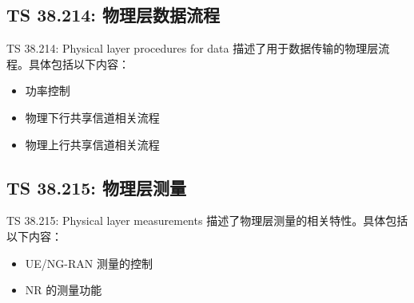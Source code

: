 \documentclass[cn,hazy,blue,14pt,screen,device=normal]{elegantnote}
\begin{document}
\subsection{TS 38.214: 物理层数据流程}
TS 38.214: Physical layer procedures for data 描述了用于数据传输的物理层流程。具体包括以下内容：
\begin{itemize}[leftmargin=2cm]
	\item 功率控制
	\item 物理下行共享信道相关流程
	\item 物理上行共享信道相关流程
\end{itemize}

\subsection{TS 38.215: 物理层测量}
TS 38.215: Physical layer measurements 描述了物理层测量的相关特性。具体包括以下内容：
\begin{itemize}[leftmargin=2cm]
	\item UE/NG-RAN 测量的控制
	\item NR 的测量功能
\end{itemize}
\end{document}
